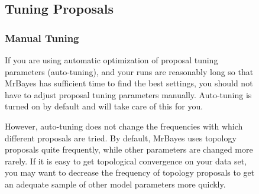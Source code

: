 \documentclass[12pt]{book}
\newcommand{\ttt}[1]{\texttt{#1}}
\newcommand{\tb}[1]{\ttt{\textbf{#1}}}
\begin{document}
\begin{figure}[h]
% 

\subsection{Tuning Proposals}

\subsubsection{Manual Tuning}

If you are using automatic optimization of proposal tuning parameters (auto-tuning), and your runs
are reasonably long so that MrBayes has sufficient time to find the best settings, you should not
have to adjust proposal tuning parameters manually. Auto-tuning is turned on by default and will
take care of this for you.

However, auto-tuning does not change the frequencies with which different proposals are tried. By
default, MrBayes uses topology proposals quite frequently, while other parameters are changed more
rarely. If it is easy to get topological convergence on your data set, you may want to decrease the
frequency of topology proposals to get an adequate sample of other model parameters more quickly.


\end{figure}
\end{document}
